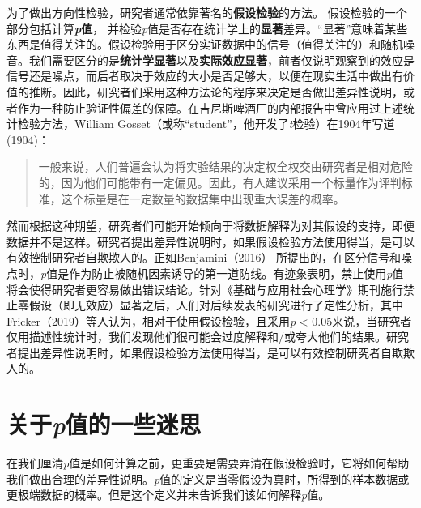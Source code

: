 \documentclass[
  letterpaper,
  DIV=11,
  numbers=noendperiod]{scrreprt}
\begin{document}
为了做出方向性检验，研究者通常依靠著名的\textbf{假设检验}的方法。
假设检验的一个部分包括计算\textbf{\emph{p}值}，
并检验\emph{p}值是否存在统计学上的\textbf{显著}差异。``显著''意味着某些东西是值得关注的。假设检验用于区分实证数据中的信号（值得关注的）和随机噪音。我们需要区分的是\textbf{统计学显著}以及\textbf{实际效应显著}，前者仅说明观察到的效应是信号还是噪点，而后者取决于效应的大小是否足够大，以便在现实生活中做出有价值的推断。因此，研究者们采用这种方法论的程序来决定是否做出差异性说明，或者作为一种防止验证性偏差的保障。在吉尼斯啤酒厂的内部报告中曾应用过上述统计检验方法，William
Gosset（或称``student''，他开发了\emph{t}检验）在1904年写道 (1904)：

\begin{quote}
一般来说，人们普遍会认为将实验结果的决定权全权交由研究者是相对危险的，因为他们可能带有一定偏见。因此，有人建议采用一个标量作为评判标准，这个标量是在一定数量的数据集中出现重大误差的概率。
\end{quote}

然而根据这种期望，研究者们可能开始倾向于将数据解释为对其假设的支持，即便数据并不是这样。研究者提出差异性说明时，如果假设检验方法使用得当，是可以有效控制研究者自欺欺人的。正如Benjamini（2016）
所提出的，在区分信号和噪点时，\emph{p}值是作为防止被随机因素诱导的第一道防线。有迹象表明，禁止使用\emph{p}值将会使得研究者更容易做出错误结论。针对《基础与应用社会心理学》期刊施行禁止零假设（即无效应）显著之后，人们对后续发表的研究进行了定性分析，其中Fricker（2019）等人认为，相对于使用假设检验，且采用\emph{p}
\textless{}
0.05来说，当研究者仅用描述性统计时，我们发现他们很可能会过度解释和/或夸大他们的结果。研究者提出差异性说明时，如果假设检验方法使用得当，是可以有效控制研究者自欺欺人的。

\hypertarget{ux5173ux4e8epux503cux7684ux4e00ux4e9bux8ff7ux601d}{%
\section{\texorpdfstring{关于\emph{p}值的一些迷思}{关于p值的一些迷思}}\label{ux5173ux4e8epux503cux7684ux4e00ux4e9bux8ff7ux601d}}

在我们厘清\emph{p}值是如何计算之前，更重要是需要弄清在假设检验时，它将如何帮助我们做出合理的差异性说明。\emph{p}值的定义是当零假设为真时，所得到的样本数据或更极端数据的概率。但是这个定义并未告诉我们该如何解释\emph{p}值。
\end{document}
